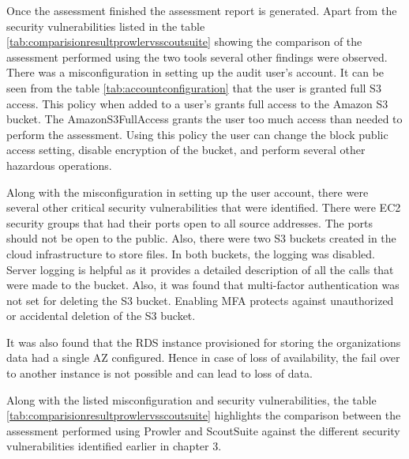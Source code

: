 \par Once the assessment finished the assessment
report is generated.
Apart from the security
vulnerabilities listed
in the table
\ref{tab:comparisionresultprowlervsscoutsuite} showing
the comparison of the assessment performed using the two
tools several other findings were observed.
There was a misconfiguration in setting up the audit user’s account.
It can be seen from the table \ref{tab:accountconfiguration} that the user is granted
full S3 access.
This policy when added to a user’s grants full access to the Amazon S3 bucket.
The AmazonS3FullAccess grants the user too much access than needed to perform the assessment.
Using this policy the user can change the block public
access setting, disable encryption of the bucket, and
perform several other hazardous operations.


\par Along with the misconfiguration in setting
up the user account, there were several other critical
security vulnerabilities that were identified.
There were EC2 security groups that had their ports open to
all source addresses.
The ports should not be open to the
public.
Also, there were two S3 buckets created in the cloud infrastructure to store files.
In both buckets, the logging was disabled.
Server logging is helpful as it provides a detailed
description of all the calls that were made to the bucket.
Also, it was found that multi-factor authentication was not set for deleting the S3 bucket.
Enabling MFA protects against unauthorized or accidental deletion of the S3 bucket.


\par It was also found that the RDS instance
provisioned for storing the organizations data had a single
AZ configured.
Hence in case of loss of availability, the fail over to
another instance is not possible and can lead to loss of
data.

\par Along with the listed misconfiguration and security vulnerabilities, the table \ref{tab:comparisionresultprowlervsscoutsuite} highlights the comparison between the assessment performed using Prowler and ScoutSuite against the different security vulnerabilities identified earlier in chapter 3.


